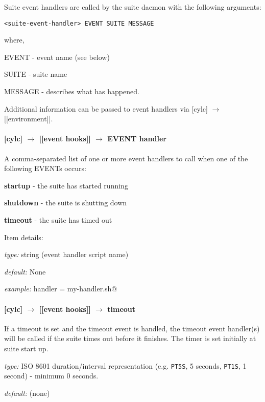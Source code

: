 Suite event handlers are called by the suite daemon with the following arguments:
\begin{lstlisting}
<suite-event-handler> EVENT SUITE MESSAGE
\end{lstlisting}
where,
\begin{myitemize}
    \item EVENT - event name (see below)
    \item SUITE - suite name
    \item MESSAGE - describes what has happened.
\end{myitemize}

Additional information can be passed to event handlers via
[cylc] $\rightarrow$ [[environment]].

\paragraph[EVENT handler]{[cylc] $\rightarrow$ [[event hooks]] $\rightarrow$ EVENT handler}

A comma-separated list of one or more event handlers to call when one of the
following EVENTs occurs:
\begin{myitemize}
    \item {\bf startup}  - the suite has started running
    \item {\bf shutdown} - the suite is shutting down
    \item {\bf timeout}  - the suite has timed out
\end{myitemize}

Item details:
\begin{myitemize}
    \item {\em type:} string (event handler script name)
    \item {\em default:} None
    \item {\em example:} \lstinline@startup handler = my-handler.sh@
\end{myitemize}

\paragraph[timeout]{[cylc] $\rightarrow$ [[event hooks]] $\rightarrow$ timeout}

If a timeout is set and the timeout event is handled, the timeout event
handler(s) will be called if the suite times out before it finishes.
The timer is set initially at suite start up.

\begin{myitemize}
    \item {\em type:} ISO 8601 duration/interval representation (e.g.
 \lstinline=PT5S=, 5 seconds, \lstinline=PT1S=, 1 second) - minimum 0 seconds.
    \item {\em default:} (none)
\end{myitemize}

